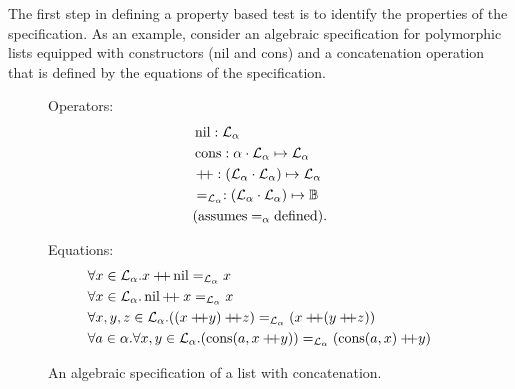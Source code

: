 
The first step in defining a property based test is
to identify the properties of the specification.
As an example, consider an algebraic specification for polymorphic lists
equipped with constructors (nil and cons) and a concatenation operation
that is defined by the equations of the specification.

\begin{figure*}
\begin{minipage}[t]{.3\linewidth}
Operators:
\begin{align*}
& \operatorname{nil} : \mathcal{L}_{\alpha} \\
& \operatorname{cons} : \alpha \cdot \mathcal{L}_{\alpha} \mapsto \mathcal{L}_{\alpha} \\
& +\!\!\!+ : (\mathcal{L}_{\alpha} \cdot \mathcal{L}_{\alpha}) \mapsto \mathcal{L}_{\alpha} \\
& =_{\mathcal{L}_{\alpha}} : (\mathcal{L}_{\alpha} \cdot \mathcal{L}_{\alpha}) \mapsto \mathbb{B} \\
& (\text{assumes} =_{\alpha} \text{defined}).
\end{align*}
\end{minipage}
\begin{minipage}[t]{.2\linewidth}
\end{minipage}
\begin{minipage}[t]{.5\linewidth}
Equations:
\begin{align*}
&\forall x \in \specL_{\alpha}.x \concat \nil =_{\specL_{\alpha}} x\\
&\forall x \in \specL_{\alpha}.\nil \concat x =_{\specL_{\alpha}} x\\
&\forall x, y, z \in \specL_{\alpha}. 
    ((x \concat y) \concat z) =_{\specL_{\alpha}} ( x \concat (y \concat z)) \\
&\forall a \in \alpha. \forall x,y \in \specL_{\alpha}. 
    (\cons (a, x \concat y)) =_{\specL_{\alpha}} (\cons (a, x) \concat y)
\end{align*}
\end{minipage}
\caption[Algebraic specification of a list]
{An algebraic specification of a list with concatenation.}
\label{intro_spec_ex}
\end{figure*}

